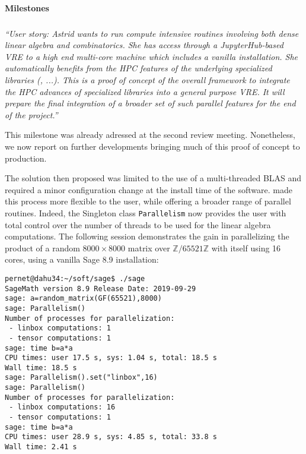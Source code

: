\paragraph{Milestones}

\subparagraph{}

\emph{“User story: Astrid wants to run compute intensive routines
  involving both dense linear algebra and combinatorics. She has
  access through a JupyterHub-based VRE to a high end multi-core
  machine which includes a vanilla \Sage installation. She
  automatically benefits from the HPC features of the underlying
  specialized libraries (\Linbox, ...). This is a proof of concept
  of the overall framework to integrate the HPC advances of
  specialized libraries into a general purpose VRE.
  It will prepare the final integration of a broader set of such
  parallel features for the end of the project.”}

This milestone was already adressed at the second review meeting.
Nonetheless, we now report on further developments bringing much of
this proof of concept to production.

The  solution then proposed was limited to the use of a multi-threaded BLAS and required a minor configuration
change at the install time of the \Sage software.  made this process
more flexible to the user, while offering a broader range of parallel routines.
Indeed, the Singleton class \texttt{Parallelism} now provides the user with total control over the number of threads to
be used for the linear algebra computations.
The following session demonstrates the gain in parallelizing the product of a random $8000\times 8000$ matrix over
$\mathbb{Z}/65521\mathbb{Z}$ with itself using 16 cores, using a
vanilla Sage 8.9 installation:
\begin{lstlisting}
pernet@dahu34:~/soft/sage$ ./sage
SageMath version 8.9 Release Date: 2019-09-29
sage: a=random_matrix(GF(65521),8000)
sage: Parallelism()
Number of processes for parallelization:
 - linbox computations: 1
 - tensor computations: 1
sage: time b=a*a
CPU times: user 17.5 s, sys: 1.04 s, total: 18.5 s
Wall time: 18.5 s
sage: Parallelism().set("linbox",16)
sage: Parallelism()
Number of processes for parallelization:
 - linbox computations: 16
 - tensor computations: 1
sage: time b=a*a
CPU times: user 28.9 s, sys: 4.85 s, total: 33.8 s
Wall time: 2.41 s
\end{lstlisting}

